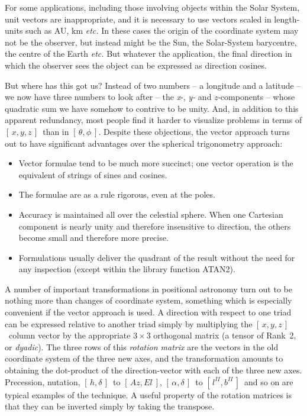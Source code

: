 \documentclass[11pt,twoside]{article}
\newcommand{\radec}     {$[\,\alpha,\delta\,]$}
\newcommand{\hadec}     {$[\,h,\delta\,]$}
\newcommand{\azel}      {$[\,Az,El~]$}
\newcommand{\gal}       {$[\,l^{I\!I},b^{I\!I}\,]$}
\newcommand{\xyz}       {$[\,x,y,z\,]$}
\begin{document}
For some applications, including those involving objects
within the Solar System, unit vectors are inappropriate, and
it is necessary to use vectors scaled in length-units such as
AU, km {\it etc.}
In these cases the origin of the coordinate system may not be
the observer, but instead might be the Sun, the Solar-System
barycentre, the centre of the Earth {\it etc.}  But whatever the application,
the final direction in which the observer sees the object can be
expressed as direction cosines.

But where has this got us?  Instead of two numbers -- a longitude and
a latitude -- we now have three numbers to look after
-- the {\it x}-, {\it y-} and
{\it z-}components -- whose quadratic sum we have somehow to contrive to
be unity.  And, in addition to this apparent redundancy,
most people find it harder to visualize
problems in terms of \xyz\ than in $[\,\theta,\phi~]$.
Despite these objections, the vector approach turns out to have
significant advantages over the spherical trigonometry approach:
\begin{itemize}
\item Vector formulae tend to be much more succinct;  one vector
      operation is the equivalent of strings of sines and cosines.
\item The formulae are as a rule rigorous, even at the poles.
\item Accuracy is maintained all over the celestial sphere.
      When one Cartesian component is nearly unity and
      therefore insensitive to direction, the others become small
      and therefore more precise.
\item Formulations usually deliver the quadrant of the result
      without the need for any inspection (except within the
      library function ATAN2).
\end{itemize}
A number of important transformations in positional
astronomy turn out to be nothing more than changes of coordinate
system, something which is especially convenient if
the vector approach is used.  A direction with respect
to one triad can be expressed relative to another triad simply
by multiplying the \xyz\ column vector by the appropriate
$3\times3$ orthogonal matrix
(a tensor of Rank~2, or {\it dyadic}).  The three rows of this
{\it rotation matrix}\/
are the vectors in the old coordinate system of the three
new axes, and the transformation amounts to obtaining the
dot-product of the direction-vector with each of the three
new axes.  Precession, nutation, \hadec\ to \azel,
\radec\ to \gal\ and so on are typical examples of the
technique.  A useful property of the rotation matrices
is that they can be inverted simply by taking the transpose.
\end{document}
